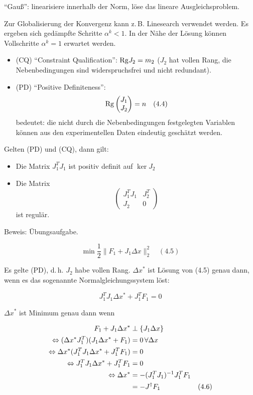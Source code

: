 "`Gauß"': linearisiere innerhalb der Norm, löse das lineare Ausgleichsproblem.


Zur Globalisierung der Konvergenz kann z.\,B. Linesearch verwendet werden. Es ergeben sich gedämpfte Schritte $\alpha^k < 1$. In der Nähe der Lösung können Vollschritte $\alpha^k=1$ erwartet werden.


\begin{itemize}
\item (CQ) "`Constraint Qualification"': $\mathrm{Rg} J_2 = m_2$ ($J_2$ hat vollen Rang, die Nebenbedingungen sind widerspruchsfrei und nicht redundant).
\item (PD) "`Positive Definiteness"':
\[ \mathrm{Rg} \begin{pmatrix} J_1 \\ J_2 \end{pmatrix} = n \quad (4.4)\]
bedeutet: die nicht durch die Nebenbedingungen festgelegten Variablen können aus den experimentellen Daten eindeutig geschätzt werden.
\end{itemize}


Gelten (PD) und (CQ), dann gilt:

\begin{itemize}
\item Die Matrix $J_1^T J_1$ ist positiv definit auf $\ker J_2$
\item Die Matrix
\[ \begin{pmatrix} J_1^T J_1 & J_2^T \\ J_2 & 0 \end{pmatrix} \]
ist regulär.
\end{itemize}

Beweis: Übungsaufgabe.



\[ \min \frac 12 \| F_1 + J_1 \Delta x \|_2^2 \quad (4.5) \]

Es gelte (PD), d.\,h. $J_2$ habe vollen Rang. $\Delta x^*$ ist Lösung von (4.5) genau dann, wenn es das sogenannte Normalgleichungssystem löst:

\[ J_1^T J_1 \Delta x^* + J_1^T F_1 = 0 \]

$\Delta x^*$ ist Minimum genau dann wenn 

\begin{align*}
F_1 + J_1 \Delta x^* &\perp \{ J_1 \Delta x\}\\
\Leftrightarrow (\Delta x^* J_1^T)(J_1 \Delta x^* + F_1) &= 0 \, \forall \Delta x \\
\Leftrightarrow \Delta x^* (J_1^T J_1 \Delta x^* + J_1^T F_1) &= 0 \\
\Leftrightarrow J_1^T J_1 \Delta x^* + J_1^T F_1 &= 0\\
\Leftrightarrow \Delta x^* &= - (J_1^T J_1)^{-1} J_1^T F_1 \\
&= - J^\dagger F_1 & (4.6)
\end{align*}

